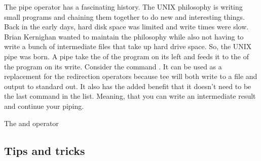 The pipe operator has a fascinating history. The UNIX philosophy is writing small programs and chaining them together to do new and interesting things. Back in the early days, hard disk space was limited and write times were slow. Brian Kernighan wanted to maintain the philosophy while also not having to write a bunch of intermediate files that take up hard drive space. So, the UNIX pipe was born. A pipe take the  of the program on its left and feeds it to the  of the program on its write. Consider the command . It can be used as a replacement for the redirection operators because tee will both write to a file and output to standard out. It also has the added benefit that it doesn't need to be the last command in the list. Meaning, that you can write an intermediate result and continue your piping.


The \keyword{&&} and \keyword{||} operator 

\subsection{Tips and tricks}

